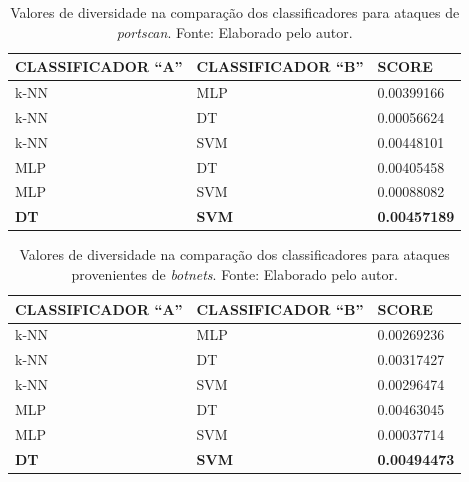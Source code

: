 \begin{description}
\begin{longtable}{l|l|l}
\end{longtable}

















\begin{longtable}{l|l|l}
\caption{Valores de diversidade na comparação dos classificadores para ataques de \textit{portscan}. Fonte: Elaborado pelo autor.}

\label{tab:diversidade_portscan}

\hline


\textbf{CLASSIFICADOR ``A''} & \textbf{CLASSIFICADOR ``B''} 		& \textbf{SCORE}         \\ \hline \hline

k-NN & MLP & 0.00399166 \\ \hline
k-NN & DT  & 0.00056624 \\ \hline
k-NN & SVM & 0.00448101 \\ \hline
MLP  & DT  & 0.00405458 \\ \hline
MLP  & SVM & 0.00088082 \\ \hline
\textbf{DT}   & \textbf{SVM} & \textbf{0.00457189} \\ \hline


\end{longtable}










\begin{longtable}{l|l|l}
\caption{Valores de diversidade na comparação dos classificadores para ataques provenientes de \textit{botnets}. Fonte: Elaborado pelo autor.}

\label{tab:diversidade_botnets}

\hline


\textbf{CLASSIFICADOR ``A''} & \textbf{CLASSIFICADOR ``B''} 		& \textbf{SCORE}         \\ \hline \hline

k-NN & MLP & 0.00269236 \\ \hline
k-NN & DT  & 0.00317427 \\ \hline
k-NN & SVM & 0.00296474\\ \hline
MLP  & DT  & 0.00463045 \\ \hline
MLP  & SVM & 0.00037714 \\ \hline
\textbf{DT}   & \textbf{SVM} & \textbf{0.00494473} \\ \hline



\end{longtable}
\end{description}
